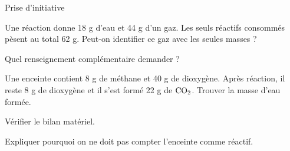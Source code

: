 \par\noindent\begin{minipage}{\linewidth}
\begin{exercice}[3]{Prise d’initiative}
\begin{questions}
\item Une réaction donne 18 g d’eau et 44 g d’un gaz. Les seuls réactifs consommés pèsent au total 62 g. Peut-on identifier ce gaz avec les seules masses ?
\item Quel renseignement complémentaire demander ?
\end{questions}
\end{exercice}
\end{minipage}
\label{defi-ex-3}
\begin{questions}
\item Une enceinte contient 8 g de méthane et 40 g de dioxygène. Après réaction, il reste 8 g de dioxygène et il s’est formé 22 g de $\ce{CO2}$. Trouver la masse d’eau formée.
\item Vérifier le bilan matériel.
\item Expliquer pourquoi on ne doit pas compter l’enceinte comme réactif.
\end{questions}
\pcGrille
